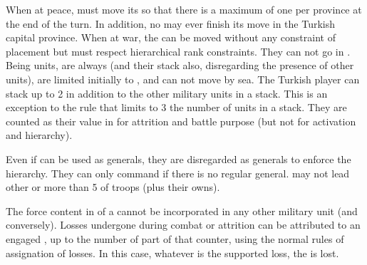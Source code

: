 \bparag When at peace, \TUR must move its \Pashas so that there is a
maximum of one \Pasha per province at the end of the turn. In addition,
no \Pasha may ever finish its move in the Turkish capital province.
\bparag When at war, the \Pashas can be moved without any constraint of
placement but must respect hierarchical rank constraints. They can not
go in \ROTW.
\bparag Being \Timar units, \Pashas are always  (and
their stack also, disregarding the presence of other 
units), are limited initially to \TARQ, and can not move by sea.
 The Turkish player can stack up to 2
\Pashas in addition to the other military units in a stack. This is an
exception to the rule that limits to 3 the number of units in a
stack. They are counted as their value in \LD for attrition and battle
purpose (but not for activation and hierarchy).

 Even if \Pashas can be used as generals,
they are disregarded as generals to enforce the hierarchy. They can only
command if there is no regular general.
\bparag[] [BLP] \Pashas may not lead other \Pashas or more than 5\LD
of troops (plus their owns).

 The force content in \LD of a \Pasha cannot be
incorporated in any other military unit (and conversely).
\bparag Losses undergone during combat or attrition can be attributed to
an engaged \Pasha, up to the number of \LD part of that \Pasha counter,
using the normal rules of assignation of losses.  In this case, whatever
is the supported loss, the \Pasha is lost. %


